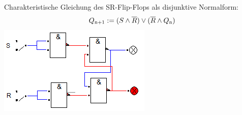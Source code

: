 \documentclass[a4paper, 11pt, fleqn, DIV=10, twoside, BCOR=10mm]{scrreprt}
\begin{document}
\begin{center}
\vspace{20mm}
Charakteristische Gleichung des SR-Flip-Flops als disjunktive Normalform:
\begin{equation}
	Q\textsubscript{n+1}:=( S\wedge \overline{R})\vee (\overline{R} \wedge Q \textsubscript{n})
\end{equation}
\includegraphics[width=0.4\columnwidth]{DT3Graphics/SR-FF-NAND.PNG}
\end{center}
\end{document}
